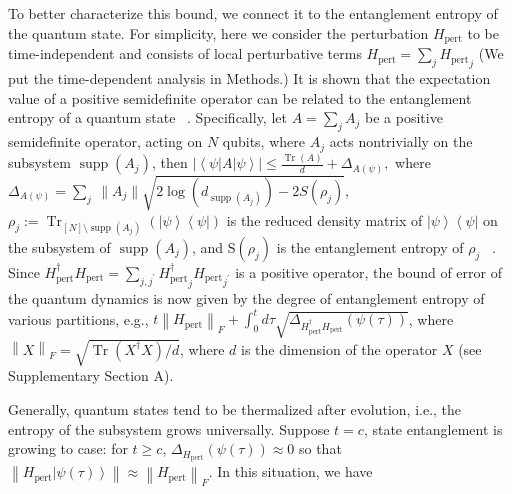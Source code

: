 \documentclass[12pt]{article}
\newcommand{\ket}[1]{\left|#1\right\rangle}
\newcommand{\bra}[1]{\left\langle #1\right|}
\newcommand{\norm}[1]{\left\lVert #1\right\rVert}
\newcommand{\Tr}{\operatorname{Tr}}
\DeclareMathOperator{\support}{supp}
\begin{document}
To better characterize this bound, we connect it to the entanglement entropy of the quantum state. For simplicity, here we consider the perturbation $H_{\text{pert}}$
to be time-independent 
and consists of local perturbative terms $H_{\text{pert}}=\sum_j {H_{\text{pert}}}_j$
(We put the time-dependent analysis in Methods.)
It is shown that the expectation value of a positive semidefinite operator can be related to the entanglement entropy of a quantum state ~\cite{Zhao_2025NP}.
Specifically, let $A=\sum_j A_j$ be a positive semidefinite operator, acting on $N$ qubits, where $A_j$ acts nontrivially on the subsystem $\support(A_j)$, then
 $ | \bra{\psi}A \ket{\psi}|\le \frac{\Tr(A)}{d}+  \Delta_{A(\psi)}, $
where $\Delta_{A(\psi)} =\sum_{j} ~\| A_j\| \sqrt{2\log(d_{\support(A_{j})})-2S(\rho_{j})},$
$\rho_{j}:=\Tr_{[N]\setminus \support(A_j)}(\ket{\psi}\bra{\psi})$ is the reduced density matrix of $\ket{\psi}\bra{\psi}$ on the subsystem of $\support(A_j)$, and $\text{S}(\rho_{j})$ is the entanglement entropy of $\rho_{j}$ ~\cite{Zhao_2025NP}. Since $H_{\text{pert}}^\dagger H_{\text{pert}}=\sum_{j,j^\prime}{H_{\text{pert}}^\dagger}_j{H_{\text{pert}} }_{j^\prime} $ is a positive operator, the bound of error of the quantum dynamics is now given by the degree of entanglement entropy of various partitions, e.g., $ t\norm{H_{\text{pert}}}_F+\int_0 ^t d\tau \sqrt{\Delta_{{H^\dagger_{\text{pert}}}{H_{\text{pert}}}} (\psi(\tau))}$,
where $\norm{X}_F=\sqrt{\Tr(X^\dagger X)/d}$, where $d$ is the dimension of the operator $X$ (see Supplementary Section A).






Generally, quantum states tend to be thermalized after evolution, i.e., the entropy of the subsystem grows universally. 
Suppose $t=c$, state entanglement is growing to case: for $t\ge c$, $\Delta_{H_{\text{pert}}}(\psi(\tau))\approx0$ so that $\norm{H_{\text{pert}} \ket{\psi(\tau)}}\approx \norm{H_{\text{pert}} }_F$. In this situation,
we have 
\end{document}
